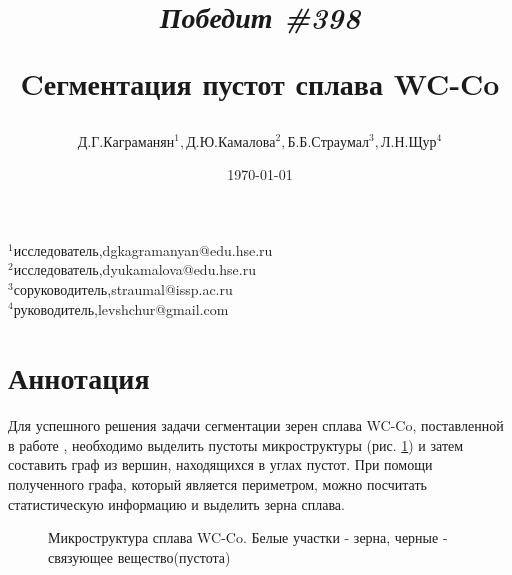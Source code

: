 \documentclass[a4paper, 14pt]{article}
\begin{document}
	\title{		\textbf{\textit{Победит \#398}} 
		
		Cегментация пустот сплава WC-Co}

	\author{$ Д.Г. Каграманян^1, Д.Ю. Камалова^2, Б.Б. Страумал^3, Л.Н. Щур^4$}
	\date{\today}
	\maketitle

	\hfill
	\begin{minipage}{1\textwidth}
			\flushleft
	    $^1$исследователь,dgkagramanyan@edu.hse.ru\\
	    $^2$исследователь,dyukamalova@edu.hse.ru \\
	    $^3$соруководитель,straumal@issp.ac.ru\\
   	 	$^4$руководитель,levshchur@gmail.com\\



	\end{minipage}%

	\section{Аннотация}
	
	Для успешного решения задачи сегментации зерен сплава WC-Co, поставленной в работе \cite{david}, необходимо выделить 
	пустоты микроструктуры (рис. \ref{fig:orig}) и затем составить граф из вершин, находящихся в углах пустот. При помощи полученного графа, который является периметром,  можно посчитать статистическую информацию и выделить зерна сплава.
	
	\begin{figure}[h]
		\caption{Микроструктура сплава WC-Co. Белые участки - зерна, черные - связующее вещество(пустота)  }
		\label{fig:orig}
	\end{figure}
	
\end{document}
